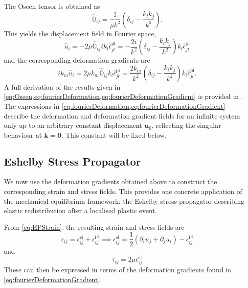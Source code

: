 \documentclass[asymmetricmargins]{library/duthesis}%
\providecommand{\DIFadd}[1]{{\protect\color{blue}\uwave{#1}}} %
\providecommand{\DIFaddbegin}{} %
\providecommand{\DIFaddend}{} %
\begin{document}
The \DIFaddbegin \DIFadd{Fourier transform of the }\DIFaddend Oseen tensor is obtained as
\begin{equation}
    \hat{\mathbb{O}}_{ij} = \frac{1}{\mu k^2}\left( \delta_{ij} - \frac{k_ik_j}{k^2} \right).
    \label{eq:Oseen}
\end{equation}
This yields the displacement field in Fourier space,
\begin{equation}
    \hat{u}_i = -2\mu \hat{\mathbb{O}}_{ij} i k_l \hat{\epsilon}_{jl}^{\mathrm{pl}}
    = -\frac{2i}{k^2}\left( \delta_{ij} - \frac{k_ik_j}{k^2} \right) k_l \hat{\epsilon}_{jl}^{\mathrm{pl}}
    \label{eq:fourierDeformation}
\end{equation}
and the corresponding deformation gradients are
\begin{equation}
    ik_m\hat{u}_i
    = 2\mu k_m \hat{\mathbb{O}}_{ij} k_l \hat{\epsilon}_{jl}^{\mathrm{pl}}
    = \frac{2 k_m}{k^2}\left( \delta_{ij} - \frac{k_ik_j}{k^2} \right) k_l \hat{\epsilon}_{jl}^{\mathrm{pl}}.
    \label{eq:fourierDeformationGradient}
\end{equation}
A full derivation of the results given in \cref{eq:Oseen,eq:fourierDeformation,eq:fourierDeformationGradient} is provided in . The expressions in \cref{eq:fourierDeformation,eq:fourierDeformationGradient} describe the deformation and deformation gradient fields for an infinite system only up to an arbitrary constant displacement $\bm{u}_0$, reflecting the singular behaviour at $\bm{k}=\bm{0}$. This constant will be fixed below.

\subsection{Eshelby Stress Propagator} \label{sec:EshelbyPropogator}

We now use the deformation gradients obtained above to construct the corresponding strain and stress fields. This provides one concrete application of the mechanical-equilibrium framework: the Eshelby stress propagator describing elastic redistribution after a localised plastic event.

From \cref{eq:EPStrain}, the resulting strain and stress fields are
\begin{equation}
        \epsilon_{ij} = \epsilon_{ij}^{\mathrm{el}} + \epsilon_{ij}^{\mathrm{pl}} \implies \epsilon^{\mathrm{el}}_{ij} = \frac{1}{2}\left( \partial_i u_j + \partial_j u_i \right) - \epsilon_{ij}^{\mathrm{pl}}
        \label{eq:eshelbyStrain}
\end{equation}
and
\begin{equation}
    \tau_{ij} = 2\mu \epsilon^{\mathrm{el}}_{ij}
    \label{eq:eshelbyStress}
\end{equation}
These can then be expressed in terms of the deformation gradients found in \cref{eq:fourierDeformationGradient}.
\DIFaddbegin 
\end{document}
